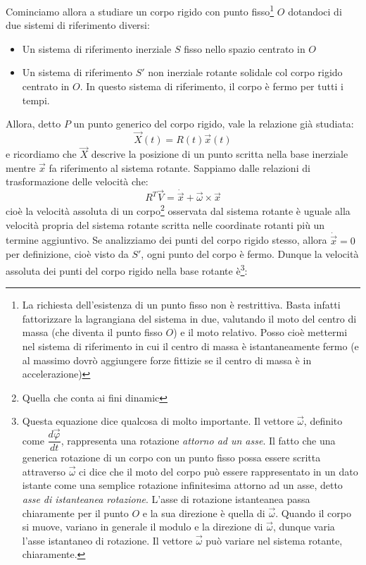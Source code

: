 \documentclass[a4paper,openany]{article}
\begin{document}
	
	Cominciamo allora a studiare un corpo rigido con punto fisso\footnote{La richiesta dell'esistenza di un punto fisso non è restrittiva. Basta infatti fattorizzare la lagrangiana del sistema in due, valutando il moto del centro di massa (che diventa il punto fisso $O$) e il moto relativo. Posso cioè mettermi nel sistema di riferimento in cui il centro di massa è istantaneamente fermo (e al massimo dovrò aggiungere forze fittizie se il centro di massa è in accelerazione)} $O$ dotandoci di due sistemi di riferimento diversi:
	\begin{itemize}
		\item Un sistema di riferimento inerziale $S$ fisso nello spazio centrato in $O$
		\item Un sistema di riferimento $S'$ non inerziale rotante solidale col corpo rigido centrato in $O$. In questo sistema di riferimento, il corpo è fermo per tutti i tempi.
	\end{itemize}
	Allora, detto $P$ un punto generico del corpo rigido, vale la relazione già studiata:
	$$
	\vec{X}(t) = R(t)\vec{x}(t)
	$$
	e ricordiamo che $\vec{X}$ descrive la posizione di un punto scritta nella base inerziale mentre $\vec{x}$ fa riferimento al sistema rotante. Sappiamo dalle relazioni di trasformazione delle velocità che:
	$$
	R^{T}\vec{V} = \dot{\vec{x}} +  \vec{\omega}\times\vec{x} 
	$$
	cioè la velocità assoluta di un corpo\footnote{Quella che conta ai fini dinamic} osservata dal sistema rotante è uguale alla velocità propria del sistema rotante scritta nelle coordinate rotanti più un termine aggiuntivo. Se analizziamo dei punti del corpo rigido stesso, allora $\dot{\vec{x}} = 0$ per definizione, cioè visto da $S'$, ogni punto del corpo è fermo. Dunque la velocità assoluta dei punti del corpo rigido nella base rotante è\footnote{Questa equazione dice qualcosa di molto importante. Il vettore $\vec{\omega}$, definito come $\dfrac{d\vec{\varphi}}{dt}$, rappresenta una rotazione \textit{attorno ad un asse}. Il fatto che una generica rotazione di un corpo con un punto fisso possa essere scritta attraverso $\vec{\omega}$ ci dice che il moto del corpo può essere rappresentato in un dato istante come una semplice rotazione infinitesima attorno ad un asse, detto \textit{asse di istanteanea rotazione}. L'asse di rotazione istanteanea passa chiaramente per il punto $O$ e la sua direzione è quella di $\vec{\omega}$. Quando il corpo si muove, variano in generale il modulo e la direzione di $\vec{\omega}$, dunque varia l'asse istantaneo di rotazione. Il vettore $\vec{\omega}$ può variare nel sistema rotante, chiaramente.}:
\end{document}
